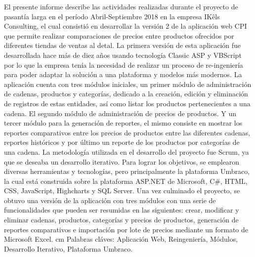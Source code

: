 \documentclass[pregrado]{tesis-usb}
\begin{document}
\frontmatter
\maketitle


\begin{resumen}
    El presente informe describe las actividades realizadas durante el proyecto de pasantía larga en el período Abril-Septiembre 2018 en la empresa IKêls Consulting, el cual consistió en desarrollar la versión 2 de la aplicación web CPI que permite realizar comparaciones de precios entre productos ofrecidos por diferentes tiendas de ventas al detal. La primera versión de esta aplicación fue desarrollada hace más de diez años usando tecnología Classic ASP y VBScript por lo que la empresa tenía la necesidad de realizar un proceso de re-ingeniería para poder adaptar la solución a una plataforma y modelos más modernos. La aplicación cuenta con tres módulos iniciales, un primer módulo de administración de cadenas, productos y categorías, dedicado a la creación, edición y eliminación de registros de estas entidades, así como listar los productos pertenecientes a una cadena. El segundo módulo de administración de precios de productos. Y un tercer módulo para la generación de reportes, el mismo consiste en mostrar los reportes comparativos entre los precios de productos entre las diferentes cadenas, reportes históricos y por último un reporte de los productos por categorías de una cadena. La metodología utilizada en el desarrollo del proyecto fue Scrum, ya que se deseaba un desarrollo iterativo. Para lograr los objetivos, se emplearon diversas herramientas y tecnologías, pero principalmente la plataforma Umbraco, la cual está construida sobre la plataforma ASP.NET de Microsoft, C\#, HTML, CSS, JavaScript, Highcharts y SQL Server. Una vez culminado el proyecto, se obtuvo una versión de la aplicación con tres módulos con una serie de funcionalidades que pueden ser resumidas en las siguientes: crear, modificar y eliminar cadenas, productos, categorías y precios de productos, generación de reportes comparativos e importación por lote de precios mediante un formato de Microsoft Excel.
   cm
    Palabras cl\'aves: Aplicación Web, Reingeniería, Módulos, Desarrollo Iterativo, Plataforma Umbraco.
\end{resumen}
\tableofcontents
\listoffigures

\mainmatter







\nocite{*}

\appendix

\end{document}
